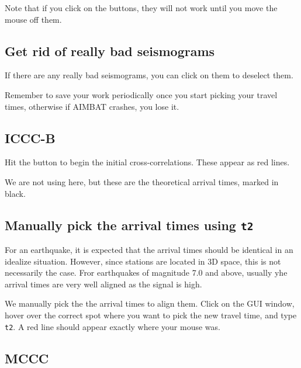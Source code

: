 \documentclass[letterpaper,10pt]{article}
\begin{document}
Note that if you click on the buttons, they will not work until you move the mouse off them.


\subsection{Get rid of really bad seismograms}

If there are any really bad seismograms, you can click on them to deselect them. 

Remember to save your work periodically once you start picking your travel times, otherwise if AIMBAT crashes, you lose it. 


\subsection{ICCC-B}

Hit the  button to begin the initial cross-correlations. These appear as red lines. 

We are not using  here, but these are the theoretical arrival times, marked in black. 


\subsection{Manually pick the arrival times using \texttt{t2}}

For an earthquake, it is expected that the arrival times should be identical in an idealize situation. However, since stations are located in 3D space, this is not necessarily the case. Fror earthquakes of magnitude 7.0 and above, usually yhe arrival times are very well aligned as the signal is high.

We manually pick the the arrival times to align them. Click on the GUI window, hover over the correct spot where you want to pick the new travel time, and type \texttt{t2}. A red line should appear exactly where your mouse was. 


\subsection{MCCC}
\end{document}
